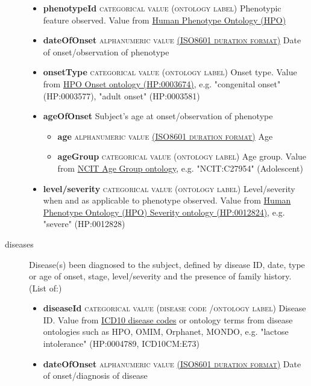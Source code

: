\documentclass[a4paper, 10pt]{article}        %
\begin{document}
\begin{description}
	\begin{itemize}
			\item[] \textbf{phenotypeId} {\textsc{categorical value (ontology label)}} Phenotypic feature observed. Value from \href{http:purl.obolibrary.org/obo/HP_0000001}{Human Phenotype Ontology (HPO)} 
			\item[] \textbf{dateOfOnset} {\textsc{alphanumeric value \href{https://www.iso.org/iso-8601-date-and-time-format.html}{(ISO8601 duration format)}}} Date of onset/observation of phenotype   
			\item[] \textbf{onsetType} {\textsc{categorical value (ontology label)}}
 Onset type. Value from \href{http://purl.obolibrary.org/obo/HP_0003674}{HPO Onset ontology (HP:0003674)}, e.g. "congenital onset" (HP:0003577), "adult onset" (HP:0003581)
  			\item[] \textbf{ageOfOnset} Subject's age at onset/observation of phenotype
			\begin{itemize}
 			\item[] \textbf{age} {\textsc{alphanumeric value \href{https://www.iso.org/iso-8601-date-and-time-format.html}{(ISO8601 duration format)}}} Age  
			\item[] \textbf{ageGroup} {\textsc{categorical value (ontology label)}} Age group. Value from \href{https://www.ebi.ac.uk/ols/ontologies/ncit/terms?iri=http%3A%2F%2Fpurl.obolibrary.org%2Fobo%2FNCIT_C20587}{NCIT Age Group ontology}, e.g. "NCIT:C27954" (Adolescent)
			\end{itemize}
			\item[] \textbf{level/severity}  {\textsc{categorical value (ontology label)}} Level/severity when and as applicable to phenotype observed. Value from \href{http://purl.obolibrary.org/obo/HP_0012824}{Human Phenotype Ontology (HPO) Severity ontology (HP:0012824)}, e.g. "severe" (HP:0012828)
	\end{itemize}
	\item[diseases] Disease(s) been diagnosed to the subject, defined by disease ID, date, type or age of onset, stage, level/severity and the presence of family history. (List of:)
	\begin{itemize}
			\item[]  \textbf{diseaseId} {\textsc{categorical value (disease code /ontology label)}} Disease ID. Value from \href{https://www.who.int/classifications/icd/en/}{ICD10 disease codes} or ontology terms from disease ontologies such as HPO, OMIM, Orphanet, MONDO, e.g. "lactose intolerance" (HP:0004789, ICD10CM:E73)
			\item[] \textbf{dateOfOnset} {\textsc{alphanumeric value \href{https://www.iso.org/iso-8601-date-and-time-format.html}{(ISO8601 duration format)}}} Date of onset/diagnosis of disease

\end{itemize}
\end{description}
\end{document}
